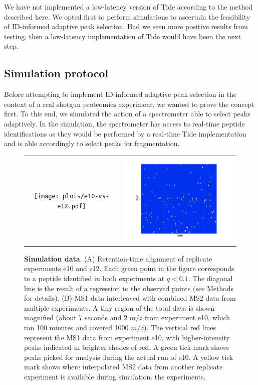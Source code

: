 \documentclass[12pt]{article}
\begin{document}
We have not implemented a low-latency version of Tide according to the
method described here.  We opted first to perform simulations to
ascertain the feasibility of ID-informed adaptive peak selection. Had
we seen more positive results from testing, then a low-latency
implementation of Tide would have been the next step.

\subsection*{Simulation protocol}

Before attempting to implement ID-informed adaptive peak selection in
the context of a real shotgun proteomics experiment, we wanted to
prove the concept first. To this end, we simulated the action of a
spectrometer able to select peaks adaptively. In the simulation, the
spectrometer has access to real-time peptide identifications as they
would be performed by a real-time Tide implementation and is able
accordingly to select peaks for fragmentation.

\begin{figure}
\centering
\begin{tabular}{cc}
\texttt{[image: plots/e10-vs-e12.pdf]} &
\includegraphics[width=3.0in]{combinedmsms.pdf} \\
\end{tabular}
\caption{{\bf Simulation data}.  (A) Retention-time alignment of
  replicate experiments e10 and e12. Each green point in the figure
  corresponds to a peptide identified in both experiments at $q<0.1$.
  The diagonal line is the result of a regression to the observed
  points (see Methods for details). (B) MS1 data interleaved with
  combined MS2 data from multiple experiments. A tiny region of the
  total data is shown magnified (about 7 seconds and 2 $m/z$ from
  experiment e10, which ran 100 minutes and covered 1000 $m/z$). The
  vertical red lines represent the MS1 data from experiment e10, with
  higher-intensity peaks indicated in brighter shades of red. A green
  tick mark shows peaks picked for analysis during the actual run of
  e10. A yellow tick mark shows where interpolated MS2 data from
  another replicate experiment is available during simulation.  the
  experiments.
  \label{figure:simdata}}
\end{figure}
\end{document}
